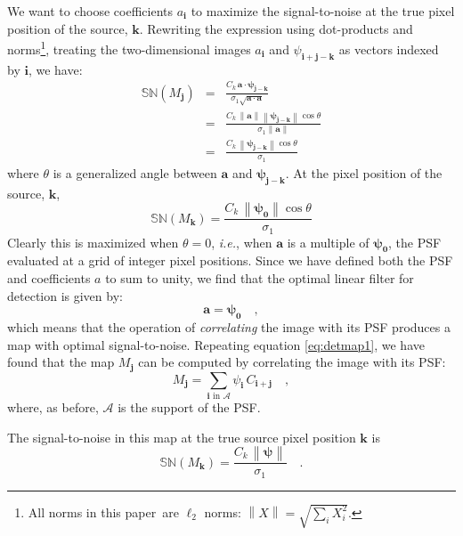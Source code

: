 \documentclass[letterpaper,preprint]{aastex62}
\newcommand{\doctype}{paper}
\newcommand{\latin}[1]{\emph{#1}}
\newcommand{\ie}{\latin{i.e.}}
\newcommand{\psf}{\psi}
\newcommand{\psfat}[1]{\psf_{#1}}
\newcommand{\signoise}{[S/N]}
\newcommand{\snr}[1]{\mathbb{SN}(#1)}
\newcommand{\norm}[1]{\left\lVert #1 \right\rVert}
\renewcommand{\vec}[1]{\boldsymbol{#1}}
\newcommand{\avec}{\vec{a}}
\newcommand{\ivec}{\vec{i}}
\newcommand{\jvec}{\vec{j}}
\newcommand{\kvec}{\vec{k}}
\newcommand{\iina}{\ivec \,\, \mathrm{in} \,\, \mathcal{A}}
\begin{document}
We want to choose coefficients $a_{\ivec}$ to maximize the 
signal-to-noise at the true pixel position of the source,
$\kvec$.  Rewriting the expression using dot-products and
norms\footnote{All norms in this \doctype\ are $\ell_2$ norms: $\norm{X} =
  \sqrt{\sum_i X_i^2}$.}, treating the two-dimensional images
$a_{\ivec}$ and $\psfat{\ivec + \jvec - \kvec}$ as vectors indexed by
$\ivec$, we have:
\begin{eqnarray}
  \snr{M_{\jvec}} &=& \frac{C_k \, \avec \cdot \bm{\psfat{j-k}}}{\sigma_1 \sqrt{\avec \cdot \avec}} \\
 &=& \frac{C_k \, \norm{\avec} \norm{\bm{\psfat{j-k}}} \cos \theta}{\sigma_1 \norm{\avec}} \\
 &=& \frac{C_k \, \norm{\bm{\psfat{j-k}}} \cos \theta}{\sigma_1}
\end{eqnarray}
where $\theta$ is a generalized angle between $\avec$ and $\bm{\psfat{j-k}}$.
At the pixel position of the source, $\kvec$,
\begin{equation}
\snr{M_{\kvec}} = \frac{C_k \, \norm{\bm{\psfat{0}}} \cos \theta}{\sigma_1}
\label{eqn:sndsingle}
\end{equation}
Clearly this is maximized when $\theta = 0$, \ie, when $\avec$ is a
multiple of $\bm{\psfat{0}}$, the PSF evaluated at a grid of integer
pixel positions.  Since we have defined both the PSF and coefficients
$a$ to sum to unity, we find that the optimal linear filter for
detection is given by:
\begin{equation}
\avec = \bm{\psfat{0}} \quad ,
\end{equation}
which means that the operation of \emph{correlating} the image with
its PSF produces a map with optimal signal-to-noise.  Repeating
equation \ref{eq:detmap1}, we have found that the map $M_{\jvec}$ can
be computed by correlating the image with its PSF:
\begin{equation}
M_{\jvec} = \sum_{\iina} \psfat{\ivec} \, C_{\ivec + \jvec} \quad ,
\end{equation}
where, as before, $\mathcal{A}$ is the support of the PSF.

The signal-to-noise in this map at the true source pixel
position $\kvec$ is
\begin{equation}
\snr{M_{\kvec}} = \frac{C_k \, \norm{\bm{\psfat{}}}}{\sigma_1} \quad .
\end{equation}
\end{document}
